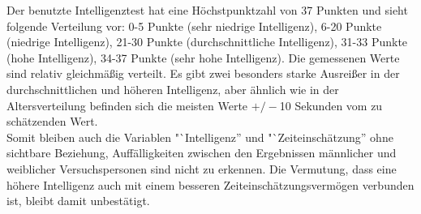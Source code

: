 \documentclass{Paper}
\begin{document}
Der benutzte Intelligenztest hat eine Höchstpunktzahl von 37 Punkten und sieht folgende Verteilung vor: 0-5 Punkte (sehr niedrige Intelligenz), 6-20 Punkte (niedrige Intelligenz), 21-30 Punkte (durchschnittliche Intelligenz), 31-33 Punkte (hohe Intelligenz), 34-37 Punkte (sehr hohe Intelligenz).
Die gemessenen Werte sind relativ gleichmäßig verteilt. Es gibt zwei besonders starke Ausreißer in der durchschnittlichen und höheren Intelligenz, aber ähnlich wie in der Altersverteilung befinden sich die meisten Werte $+/-$10 Sekunden vom zu schätzenden Wert.\\
Somit bleiben auch die Variablen "`Intelligenz'' und "`Zeiteinschätzung'' ohne sichtbare Beziehung, Auffälligkeiten zwischen den Ergebnissen männlicher und weiblicher Versuchspersonen sind nicht zu erkennen. Die Vermutung, dass eine höhere Intelligenz auch mit einem besseren Zeiteinschätzungsvermögen verbunden ist, bleibt damit unbestätigt.
\end{document}
